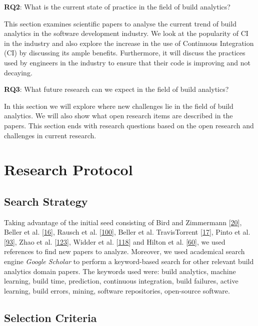 \documentclass[]{book}
\begin{document}
\textbf{RQ2}: What is the current state of practice in the field of
build analytics?

This section examines scientific papers to analyse the current trend of
build analytics in the software development industry. We look at the
popularity of CI in the industry and also explore the increase in the
use of Continuous Integration (CI) by discussing its ample benefits.
Furthermore, it will discuss the practices used by engineers in the
industry to ensure that their code is improving and not decaying.

\textbf{RQ3}: What future research can we expect in the field of build
analytics?

In this section we will explore where new challenges lie in the field of
build analytics. We will also show what open research items are
described in the papers. This section ends with research questions based
on the open research and challenges in current research.

\section{Research Protocol}\label{build-analytics-research-protocol}

\subsection{Search Strategy}\label{search-strategy}

Taking advantage of the initial seed consisting of Bird and Zimmermann
{[}\protect\hyperlink{ref-bird2017predicting}{20}{]}, Beller et al.
{[}\protect\hyperlink{ref-beller2017oops}{16}{]}, Rausch et al.
{[}\protect\hyperlink{ref-rausch2017empirical}{100}{]}, Beller et al.
TravisTorrent {[}\protect\hyperlink{ref-beller2017travistorrent}{17}{]},
Pinto et al. {[}\protect\hyperlink{ref-pinto2018work}{93}{]}, Zhao et
al. {[}\protect\hyperlink{ref-zhao2017impact}{123}{]}, Widder et al.
{[}\protect\hyperlink{ref-widder2018m}{118}{]} and Hilton et al.
{[}\protect\hyperlink{ref-hilton2016usage}{60}{]}, we used references to
find new papers to analyze. Moreover, we used academical search engine
\emph{Google Scholar} to perform a keyword-based search for other
relevant build analytics domain papers. The keywords used were: build
analytics, machine learning, build time, prediction, continuous
integration, build failures, active learning, build errors, mining,
software repositories, open-source software.

\subsection{Selection Criteria}\label{selection-criteria}
\end{document}
